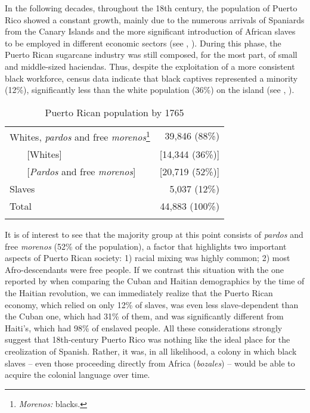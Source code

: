 \documentclass[output=paper,colorlinks,citecolor=brown]{langscibook}
\begin{document}
\begin{sloppypar}
In the following decades, throughout the 18th century, the population of Puerto Rico showed a constant growth, mainly due to the numerous arrivals of Spaniards from the Canary Islands and the more significant introduction of African slaves to be employed in different economic sectors (see , \citealt[75]{AlvarezNazario1974}). During this phase, the Puerto Rican sugarcane industry was still composed, for the most part, of small and middle-sized haciendas. Thus, despite the exploitation of a more consistent black workforce, census data indicate that black captives represented a minority (12\%), significantly less than the white population (36\%) on the island (see , \citealt[76]{AlvarezNazario1974}).
\end{sloppypar}

\begin{table}
\begin{tabular}{lr}
\lsptoprule
{Whites, \textit{pardos} and free \textit{morenos}}\footnote{\textit{Morenos:} blacks.} & 39,846 \phantom{1}(88\%)\\
~~~ {[Whites]}&  {[14,344 \phantom{1}(36\%)]}\\
~~~ {[\textit{Pardos} and free \textit{morenos}]} &  [20,719 \phantom{1}(52\%)]\\
 {Slaves} & 5,037 \phantom{1}(12\%)\\
 \midrule
 {Total} & 44,883 (100\%)\\
\lspbottomrule
\end{tabular}
\caption{Puerto Rican population by 1765\label{tab:visconti:6}}
\end{table}


It is of interest to see that the majority group at this point consists of \textit{pardos} and free \textit{morenos} (52\% of the population), a factor that highlights two important aspects of Puerto Rican society: 1) racial mixing was highly common; 2) most Afro-descendants were free people. If we contrast this situation with the one reported by \citet[78--79]{Clements2009} when comparing the Cuban and Haitian demographics by the time of the Haitian revolution, we can immediately realize that the Puerto Rican economy, which relied on only 12\% of slaves, was even less slave-dependent than the Cuban one, which had 31\% of them, and was significantly different from Haiti’s, which had 98\% of enslaved people. All these considerations strongly suggest that 18th-century Puerto Rico was nothing like the ideal place for the creolization of Spanish. Rather, it was, in all likelihood, a colony in which black slaves -- even those proceeding directly from Africa (\textit{bozales}) -- would be able to acquire the colonial language over time.
\end{document}
